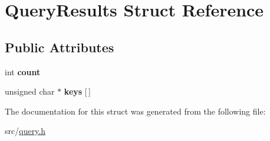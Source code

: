 \hypertarget{struct_query_results}{}\section{Query\+Results Struct Reference}
\label{struct_query_results}
\subsection*{Public Attributes}
\begin{DoxyCompactItemize}
\item 
\hypertarget{struct_query_results_a976de07ec3d3182cddc5f6720912c21f}{}int {\bfseries count}\label{struct_query_results_a976de07ec3d3182cddc5f6720912c21f}

\item 
\hypertarget{struct_query_results_a19d38224b317f2ba566be472c11d22bd}{}unsigned char $\ast$ {\bfseries keys} \mbox{[}$\,$\mbox{]}\label{struct_query_results_a19d38224b317f2ba566be472c11d22bd}

\end{DoxyCompactItemize}


The documentation for this struct was generated from the following file\+:\begin{DoxyCompactItemize}
\item 
src/\hyperlink{query_8h}{query.\+h}\end{DoxyCompactItemize}
